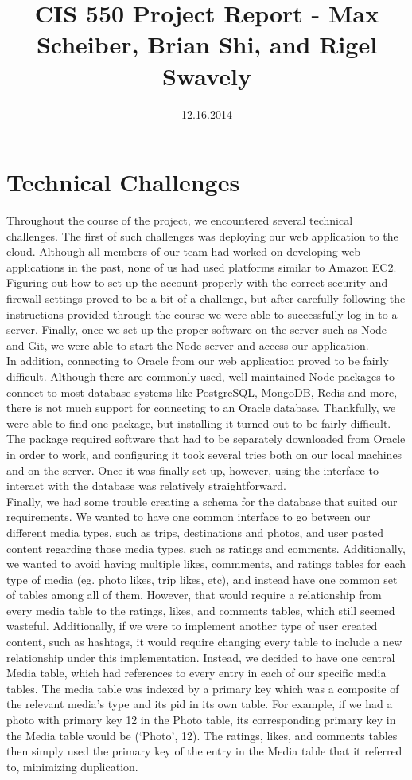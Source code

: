 \documentclass[11pt]{amsart}
\title{CIS 550 Project Report - Max Scheiber, Brian Shi, and Rigel Swavely}
\date{12.16.2014}
\begin{document}
\maketitle
\section{Technical Challenges}
Throughout the course of the project, we encountered several technical challenges. The first of such 
challenges was deploying our web application to the cloud. Although all members of our team had 
worked on developing web applications in the past, none of us had used platforms similar to Amazon EC2.
Figuring out how to set up the account properly with the correct security and firewall settings proved
to be a bit of a challenge, but after carefully following the instructions provided through the course
we were able to successfully log in to a server. Finally, once we set up the proper software on the server
such as Node and Git, we were able to start the Node server and access our application.\\

In addition, connecting to Oracle from our web application proved to be fairly difficult. Although there are
commonly used, well maintained Node packages to connect to most database systems like PostgreSQL, MongoDB,
Redis and more, there is not much support for connecting to an Oracle database. Thankfully, we were able to find
one package, but installing it turned out to be fairly difficult. The package required software that had to be
separately downloaded from Oracle in order to work, and configuring it took several tries both on our local machines
and on the server. Once it was finally set up, however, using the interface to interact with the database was
relatively straightforward.\\

Finally, we had some trouble creating a schema for the database that suited our requirements. We wanted to have
one common interface to go between our different media types, such as trips, destinations and photos, and user posted
content regarding those media types, such as ratings and comments. Additionally, we wanted to avoid having multiple 
likes, commments, and ratings tables for each type of media (eg. photo likes, trip likes, etc), and instead
have one common set of tables among all of them. However, that would require a relationship from every media
table to the ratings, likes, and comments tables, which still seemed wasteful. Additionally, if we were to implement
another type of user created content, such as hashtags, it would require changing every table to include a
new relationship under this implementation. Instead, we decided to have one central Media table, which had references to
every entry in each of our specific media tables. The media table was indexed by a primary key which was a composite
of the relevant media's type and its pid in its own table. For example, if we had a photo with primary key 12 in the Photo table, its corresponding primary key in the Media table would be (`Photo', 12). The ratings, likes, and comments tables then simply used the primary key of the entry in the Media table that it referred to, minimizing duplication.
\end{document}
